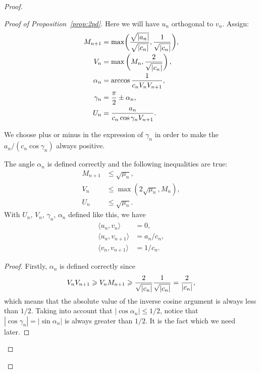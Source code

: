 \begin{proof}
\begin{proof}[Proof of Proposition~\ref{prop:2pd}]
          Here we will have $u_n$ orthogonal to $v_n$.
          Assign:
          \begin{align*}
            M_{n+1} &= \max\biggl(\smash[b]{\frac{\sqrt{|a_n|}}{\sqrt{|c_n|}}}, \frac{1}{\sqrt{\smash[b]{|c_n|}}}\biggr),\\
            V_n &= \max\left(M_n, \frac{2}{\sqrt{\smash[b]{|c_n|}}}\right),\\
            \alpha_n &= \arccos{\frac{1}{c_n V_n V_{n+1}}},\\
            \gamma_n &= \frac{\pi}{2} \pm \alpha_n,\\
            U_n &= \frac{a_n}{c_n \cos{\gamma_n} V_{n+1}}.
          \end{align*}
          \begin{remark*}
            We choose plus or minus in the expression of $\gamma_n$ in order to make the $a_n/(c_n \cos{\gamma_n})$ always positive.
          \end{remark*}
          \begin{prop}
            The angle $\alpha_n$ is defined correctly and the following inequalities are true:
            \begin{align*}
                M_{n+1} &\leq \sqrt{\mu_n},\\
                V_n &\leq \max(2\sqrt{\mu_n}, M_n),\\
                U_n &\leq \sqrt{\mu_n}.
            \end{align*}
            With $U_n$, $V_n$, $\gamma_n$, $\alpha_n$ defined like this, we have
            \begin{equation}
              \label{eqn:case2}
              \begin{aligned}
                \langle u_n, v_n \rangle &= 0,\\
                \langle u_n, v_{n+1} \rangle &= a_n/c_n,\\
                \langle v_n, v_{n+1} \rangle &= 1/c_n.
              \end{aligned}
            \end{equation}
          \end{prop}
          \begin{proof}
            Firstly, $\alpha_n$ is defined correctly since
            \[
              V_n V_{n+1} \geq V_n M_{n+1} \geq \frac{2}{\sqrt{\smash[b]{|c_n|}}} \frac{1}{\sqrt{\smash[b]{|c_n|}}} = \frac{2}{|c_n|},
            \]
              which means that the absolute value of the inverse cosine argument is always less than $1/2$.
            Taking into account that $|\cos{\alpha_n}| \leq 1/2$, notice that $|\cos{\gamma_n}| = |\sin{\alpha_n}|$ is always greater than $1/2$.
            It is the fact which we need later.


\end{proof}
\end{proof}
\end{proof}
